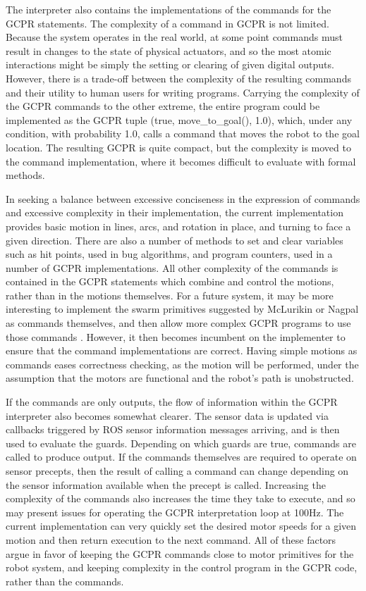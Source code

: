 The interpreter also contains the implementations of the commands for the GCPR statements. 
The complexity of a command in GCPR is not limited. 
Because the system operates in the real world, at some point commands must result in changes to the state of physical actuators, and so the most atomic interactions might be simply the setting or clearing of given digital outputs. 
However, there is a trade-off between the complexity of the resulting commands and their utility to human users for writing programs. 
Carrying the complexity of the GCPR commands to the other extreme, the entire program could be implemented as the GCPR tuple (true, move\_to\_goal(), 1.0), which, under any condition, with probability 1.0, calls a command that moves the robot to the goal location. 
The resulting GCPR is quite compact, but the complexity is moved to the command implementation, where it becomes difficult to evaluate with formal methods. 

In seeking a balance between excessive conciseness in the expression of commands and excessive complexity in their implementation, the current implementation provides basic motion in lines, arcs, and rotation in place, and turning to face a given direction. 
There are also a number of methods to set and clear variables such as hit points, used in bug algorithms, and program counters, used in a number of GCPR implementations. 
All other complexity of the commands is contained in the GCPR statements which combine and control the motions, rather than in the motions themselves. 
For a future system, it may be more interesting to implement the swarm primitives suggested by McLurikin or Nagpal as commands themselves, and then allow more complex GCPR programs to use those commands \citep{mclurkin2004stupid, nagpal2004catalog}.
However, it then becomes incumbent on the implementer to ensure that the command implementations are correct. 
Having simple motions as commands eases correctness checking, as the motion will be performed, under the assumption that the motors are functional and the robot's path is unobstructed. 

If the commands are only outputs, the flow of information within the GCPR interpreter also becomes somewhat clearer. 
The sensor data is updated via callbacks triggered by ROS sensor information messages arriving, and is then used to evaluate the guards. 
Depending on which guards are true, commands are called to produce output. 
If the commands themselves are required to operate on sensor precepts, then the result of calling a command can change depending on the sensor information available when the precept is called.
Increasing the complexity of the commands also increases the time they take to execute, and so may present issues for operating the GCPR interpretation loop at 100Hz. 
The current implementation can very quickly set the desired motor speeds for a given motion and then return execution to the next command.
All of these factors argue in favor of keeping the GCPR commands close to motor primitives for the robot system, and keeping complexity in the control program in the GCPR code, rather than the commands. 

